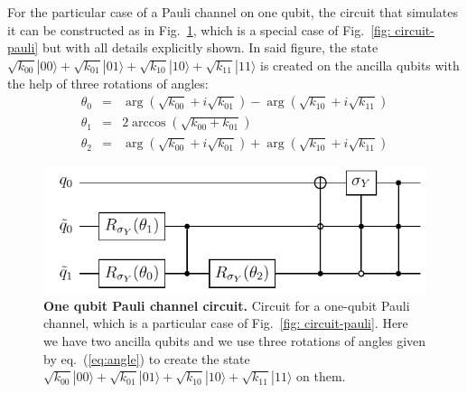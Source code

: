 \documentclass[10pt,letterpaper]{article} %
\newcommand{\fref}[1]{Fig.~\ref{#1}}
\newcommand{\eref}[1]{eq.~(\ref{#1})}
\begin{document}
For the particular case of a Pauli channel on one qubit, the circuit that
simulates it can be constructed as in \fref{fig: circuit-pauli-1},
which is a special case of \fref{fig: circuit-pauli}
but with all details  explicitly shown.
In said figure, the state 
$\sqrt{k_{00}} |00\rangle + \sqrt{k_{01}} |01\rangle + \sqrt{k_{10}} 
|10\rangle + \sqrt{k_{11}}|11\rangle$
is created on the ancilla qubits with the help of three rotations of angles:
\begin{subequations}
\begin{eqnarray}
\theta_0 &= &\arg(\sqrt{k_{00}} + i \sqrt{k_{01}}) -
\arg(\sqrt{k_{10}} + i\sqrt{k_{11}})
\label{eq:angle1} \\ 
\theta_1 &= &2 \arccos(\sqrt{k_{00} +
k_{01}})
\label{eq:angle2} \\
\theta_2 &= &\arg(\sqrt{k_{00}} + i \sqrt{k_{01}}) +
\arg(\sqrt{k_{10}} + i\sqrt{k_{11}})
\label{eq:angle3}
\end{eqnarray}
\label{eq:angle}
\end{subequations}



\begin{figure} %
\centering
\includegraphics{images/circuito_unqubit.pdf}
\caption{
 
{\bf One qubit Pauli channel circuit.} Circuit for a one-qubit Pauli channel,
which is a particular case of \fref{fig: circuit-pauli}.  Here we have two
ancilla qubits and we use three rotations
of angles given by \eref{eq:angle} to create the state $\sqrt{k_{00}} |00\rangle + \sqrt{k_{01}} |01\rangle + \sqrt{k_{10}} 
|10\rangle + \sqrt{k_{11}}|11\rangle$
on them.
}
\label{fig: circuit-pauli-1} 
\end{figure} %
\end{document}
